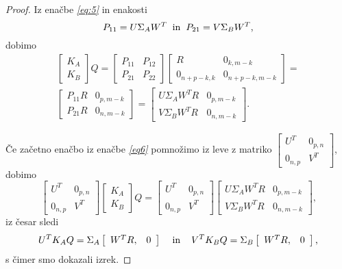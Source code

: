 \documentclass[mat1]{article}
\theoremstyle{definition}
\begin{document}
\begin{proof}
Iz enačbe  \textit{\eqref{eq:5}} in enakosti
$$
P_{11} = U \Sigma_A W^T
\hspace{2mm} \text{in} \hspace{2mm}
P_{21} = V \Sigma_B W^T \text{,}
$$ dobimo
\begin{equation} \label{eq6}
\begin{split}
\begin{bmatrix} 
K_A \\
K_B 
\end{bmatrix} Q =
\begin{bmatrix} 
P_{11} & P_{12} \\
P_{21} & P_{22} 
\end{bmatrix}
\begin{bmatrix} 
R & 0_{k, m-k} \\
0_{n+p-k, k} & 0_{n+p-k, m-k}  
\end{bmatrix} =
\\
\begin{bmatrix} 
P_{11}R & 0_{p, m-k} \\
P_{21}R & 0_{n, m-k} 
\end{bmatrix} =
\begin{bmatrix} 
U \Sigma_A W^T R & 0_{p, m-k} \\
V \Sigma_B W^T R & 0_{n, m-k} 
\end{bmatrix} \text{.}
\end{split}
\end{equation}

Če začetno enačbo iz enačbe \textit{\eqref{eq6}} pomnožimo iz leve z matriko 
$
\begin{bmatrix}
U^T & 0_{p, n} \\
0_{n, p} & V^T
\end{bmatrix}
$, dobimo 
$$
\begin{bmatrix}
U^T & 0_{p, n} \\
0_{n, p} & V^T
\end{bmatrix}
\begin{bmatrix} 
K_A \\
K_B 
\end{bmatrix} Q =
\begin{bmatrix}
U^T & 0_{p, n} \\
0_{n, p} & V^T
\end{bmatrix}
\begin{bmatrix} 
U \Sigma_A W^T R & 0_{p, m-k} \\
V \Sigma_B W^T R & 0_{n, m-k} 
\end{bmatrix} \text{,}
$$
iz česar sledi
$$
U^T K_A Q = 
\Sigma_A  \left[\begin{array}{cc} W^T R, & 0 \end{array}\right] \hspace{4mm} \text{in} \hspace{4mm} V^T K_B Q = \Sigma_B  \left[\begin{array}{cc} W^T R, & 0 \end{array}\right] \text{,}
$$
s čimer smo dokazali izrek.
\end{proof}
\end{document}
